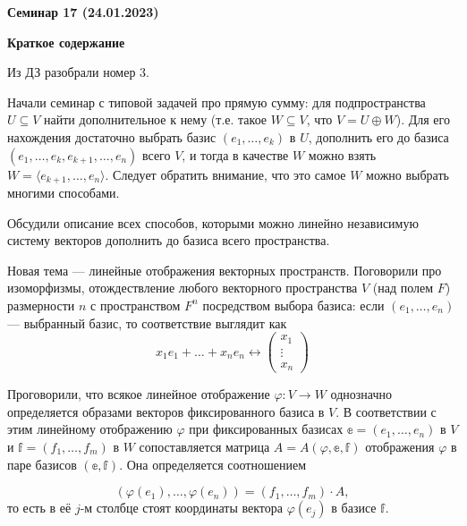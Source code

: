 \documentclass[10pt, a4paper]{extarticle}
\theoremstyle{definition}
\begin{document}
\begin{center}
\small
\noindent{}
\end{center}

\large

\begin{center}
\textbf{Семинар 17 (24.01.2023)}
\end{center}

\textbf{Краткое содержание}

Из ДЗ разобрали номер 3.

Начали семинар с типовой задачей про прямую сумму: для подпространства $U \subseteq V$ найти дополнительное к нему (т.е. такое 
$W \subseteq V$, что $V = U \oplus W$). Для его нахождения достаточно выбрать базис $(e_1,\dots, e_k)$ в $U$, дополнить его до базиса 
$(e_1,\dots, e_k, e_{k+1}, \dots, e_n)$ всего $V$, и тогда в качестве $W$ можно взять $W = \langle e_{k+1},\dots, e_n \rangle$.
Следует обратить внимание, что это самое $W$ можно выбрать многими способами.

Обсудили описание всех способов, которыми можно линейно независимую систему векторов дополнить до базиса всего пространства.

Новая тема --- линейные отображения векторных пространств.
Поговорили про изоморфизмы, отождествление любого векторного пространства $V$ (над полем $F$) размерности $n$ с пространством $F^n$ 
посредством выбора базиса: если $(e_1,\dots,e_n)$ --- выбранный базис, то соответствие выглядит как
\[
    x_1e_1+ \dots + x_ne_n \leftrightarrow \begin{pmatrix} x_1 \\ \vdots \\ x_n \end{pmatrix}
\]

Проговорили, что всякое линейное отображение $\varphi \colon V \to W$ однозначно определяется образами векторов фиксированного базиса в $V$.
В соответствии с этим линейному отображению $\varphi$ при фиксированных базисах $\mathbb e = (e_1,\dots, e_n)$ в $V$ и $\mathbb f = (f_1,\dots, f_m)$ 
в $W$ сопоставляется матрица $A = A(\varphi, \mathbb e, \mathbb f)$ отображения $\varphi$ в паре базисов $(\mathbb e, \mathbb f)$.
Она определяется соотношением

\[
(\varphi(e_1),\dots, \varphi(e_n)) = (f_1,\dots,f_m) \cdot A,
\]
то есть в её $j$-м столбце стоят координаты вектора $\varphi(e_j)$ в базисе $\mathbb f$.
\end{document}
